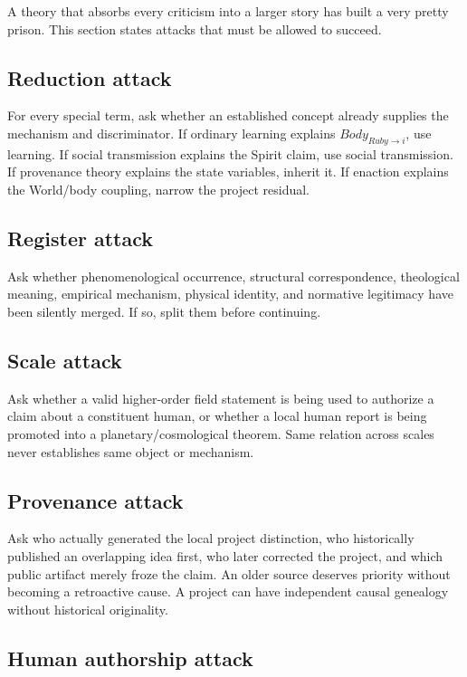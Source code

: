 \documentclass[11pt]{article}
\begin{document}
A theory that absorbs every criticism into a larger story has built a very pretty prison. This section states attacks that must be allowed to succeed.

\subsection{Reduction attack}

For every special term, ask whether an established concept already supplies the mechanism and discriminator. If ordinary learning explains $Body_{Ruby\rightarrow i}$, use learning. If social transmission explains the Spirit claim, use social transmission. If provenance theory explains the state variables, inherit it. If enaction explains the World/body coupling, narrow the project residual.

\subsection{Register attack}

Ask whether phenomenological occurrence, structural correspondence, theological meaning, empirical mechanism, physical identity, and normative legitimacy have been silently merged. If so, split them before continuing.

\subsection{Scale attack}

Ask whether a valid higher-order field statement is being used to authorize a claim about a constituent human, or whether a local human report is being promoted into a planetary/cosmological theorem. Same relation across scales never establishes same object or mechanism.

\subsection{Provenance attack}

Ask who actually generated the local project distinction, who historically published an overlapping idea first, who later corrected the project, and which public artifact merely froze the claim. An older source deserves priority without becoming a retroactive cause. A project can have independent causal genealogy without historical originality.

\subsection{Human authorship attack}
\end{document}
